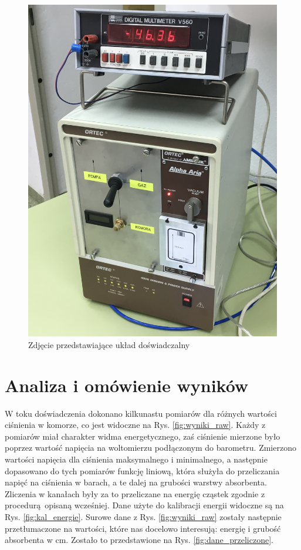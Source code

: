 \documentclass[12pt,a4paper]{article}
\begin{document}
\begin{figure}[h!]
    \centering
    \includegraphics[keepaspectratio, width=0.8\linewidth]{zdj_uklad.JPG}
    \caption{Zdjęcie przedstawiające układ doświadczalny \cite{pracownia}}
    \label{fig:uklad}
\end{figure}

\section{Analiza i omówienie wyników}

W toku doświadczenia dokonano kilkunastu pomiarów dla różnych wartości ciśnienia w komorze, co jest widoczne na Rys. \ref{fig:wyniki_raw}. Każdy z pomiarów miał charakter widma energetycznego, zaś ciśnienie mierzone było poprzez wartość napięcia na woltomierzu podłączonym do barometru. Zmierzono wartości napięcia dla ciśnienia maksymalnego i minimalnego, a następnie dopasowano do tych pomiarów funkcję liniową, która służyła do przeliczania napięć na ciśnienia w barach, a te dalej na grubości warstwy absorbenta. Zliczenia w kanałach były za to przeliczane na energię cząstek zgodnie z procedurą opisaną wcześniej. Dane użyte do kalibracji energii widoczne są na Rys. \ref{fig:kal_energie}. Surowe dane z Rys. \ref{fig:wyniki_raw} zostały następnie przetłumaczone na wartości, które nas docelowo interesują: energię i grubość absorbenta w cm. Zostało to przedstawione na Rys. \ref{fig:dane_przeliczone}.
\end{document}
